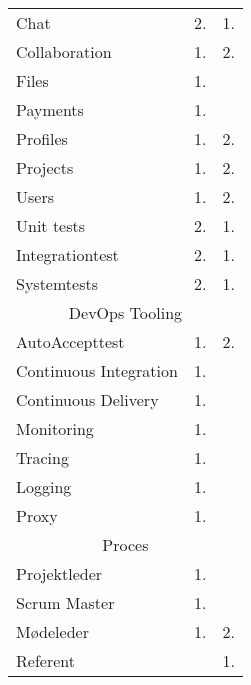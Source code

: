 \begin{table}[H]
\begin{tabular}{lcc}
    Chat                   & 2.              & 1.             \\
    Collaboration          & 1.              & 2.             \\
    Files                  & 1.              &                \\
    Payments               & 1.              &                \\
    Profiles               & 1.              & 2.             \\
    Projects               & 1.              & 2.             \\
    Users                  & 1.              & 2.             \\
    Unit tests             & 2.              & 1.             \\
    Integrationtest        & 2.              & 1.             \\ 
    Systemtests            & 2.              & 1.             \\ \hline
    \multicolumn{3}{c}{DevOps Tooling}                        \\ \hline
    AutoAccepttest         & 1.              & 2.             \\
    Continuous Integration & 1.              &                \\
    Continuous Delivery    & 1.              &                \\
    Monitoring             & 1.              &                \\
    Tracing                & 1.              &                \\
    Logging                & 1.              &                \\
    Proxy                  & 1.              &                \\ \hline
    \multicolumn{3}{c}{Proces}                                \\ \hline

    Projektleder           & 1.              &                \\
    Scrum Master           & 1.              &                \\
    Mødeleder              & 1.              & 2.             \\
    Referent               &                 & 1.             \\
  \end{tabular}
\end{table}